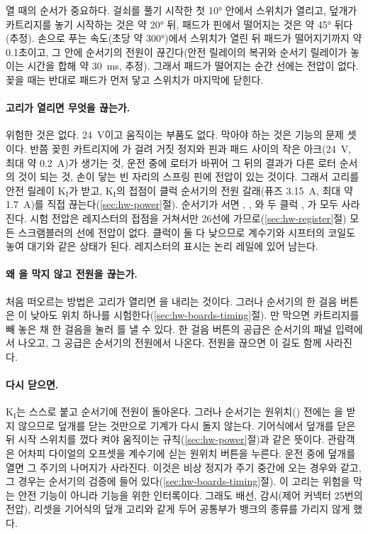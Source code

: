 열 때의 순서가 중요하다. 걸쇠를 풀기 시작한 첫 10° 안에서 스위치가 열리고, 덮개가 카트리지를 놓기 시작하는 것은
약 20° 뒤, 패드가 핀에서 떨어지는 것은 약 45° 뒤다(추정). 손으로 푸는 속도(초당 약 300°)에서 스위치가 열린 뒤
패드가 떨어지기까지 약 0.1초이고, 그 안에 순서기의 전원이 끊긴다(안전 릴레이의 복귀와 순서기 릴레이가 놓이는 시간을
합해 약 30~ms, 추정). 그래서 패드가 떨어지는 순간 선에는 전압이 없다. 꽂을 때는 반대로 패드가 먼저 닿고 스위치가
마지막에 닫힌다.

\paragraph{고리가 열리면 무엇을 끊는가.} 위험한 것은 없다. 24~V이고 움직이는 부품도 없다. 막아야 하는 것은 기능의
문제 셋이다. 반쯤 꽂힌 카트리지에 가 걸려 거짓 정지와 핀과 패드 사이의 작은 아크(24~V, 최대 약 0.2~A)가
생기는 것, 운전 중에 로터가 바뀌어 그 뒤의 결과가 다른 로터 순서의 것이 되는 것, 손이 닿는 빈 자리의 스프링 핀에
전압이 있는 것이다. 그래서 고리를 안전 릴레이 K$_\mathrm{I}$가 받고, K$_\mathrm{I}$의 접점이 클럭 순서기의 전원
갈래(퓨즈 3.15~A, 최대 약 1.7~A)를 직접 끊는다(\ref{sec:hw-power}절). 순서기가 서면 , ,
와 두 클럭 , 가 모두 사라진다. 시험 전압은 레지스터의  접점을 거쳐서만
26선에 가므로(\ref{sec:hw-register}절) 모든 스크램블러의 선에 전압이 없다. 클럭이 둘 다 낮으므로 계수기와 시프터의
코일도 놓여 대기와 같은 상태가 된다. 레지스터의 표시는 논리 레일에 있어 남는다.

\paragraph{왜 을 막지 않고 전원을 끊는가.} 처음 떠오르는 방법은 고리가 열리면 을 내리는 것이다.
그러나 순서기의 한 걸음 버튼은 이 낮아도 위치 하나를 시험한다(\ref{sec:hw-boards-timing}절). 만
막으면 카트리지를 빼 놓은 채 한 걸음을 눌러 를 낼 수 있다. 한 걸음 버튼의 공급은 순서기의 패널 입력에서
나오고, 그 공급은 순서기의 전원에서 나온다. 전원을 끊으면 이 길도 함께 사라진다.

\paragraph{다시 닫으면.} K$_\mathrm{I}$는 스스로 붙고 순서기에 전원이 돌아온다. 그러나 순서기는 원위치()
전에는 을 받지 않으므로 덮개를 닫는 것만으로 기계가 다시 돌지 않는다. 기어식에서 덮개를 닫은 뒤 시작
스위치를 껐다 켜야 움직이는 규칙(\ref{sec:hw-power}절)과 같은 뜻이다. 관람객은 어차피 다이얼의 오프셋을 계수기에
싣는 원위치 버튼을 누른다. 운전 중에 덮개를 열면 그 주기의 나머지가 사라진다. 이것은 비상 정지가 주기 중간에 오는
경우와 같고, 그 경우는 순서기의 검증에 들어 있다(\ref{sec:hw-boards-timing}절). 이 고리는 위험을 막는 안전 기능이
아니라 기능을 위한 인터록이다. 그래도 배선, 감시(제어 커넥터 25번의 전압), 리셋을 기어식의 덮개 고리와 같게 두어
공통부가 뱅크의 종류를 가리지 않게 했다.

